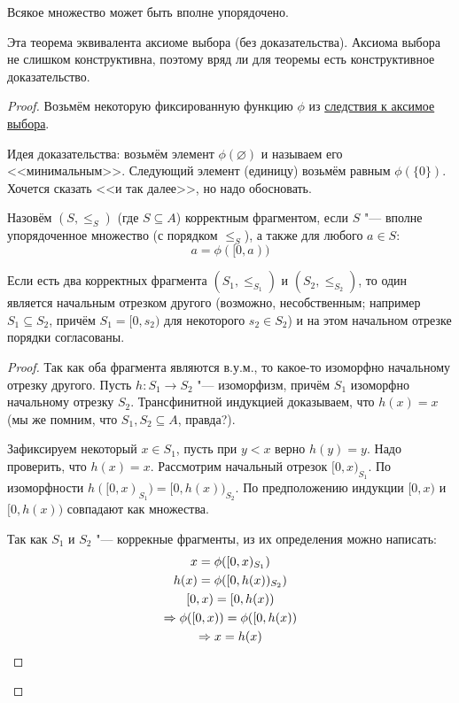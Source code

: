 \begin{theorem}[Цермелло]
	Всякое множество может быть вполне упорядочено.
\end{theorem}
\begin{Rem}
	Эта теорема эквивалента аксиоме выбора (без доказательства).
	Аксиома выбора не слишком конструктивна, поэтому вряд ли для теоремы есть конструктивное доказательство.
\end{Rem}
\begin{proof}
	Возьмём некоторую фиксированную функцию $\phi$ из \hyperref[axiom_of_choice_phi]{следствия к аксимое выбора}.

	Идея доказательства: возьмём элемент $\phi(\varnothing)$ и называем его <<минимальным>>.
	Следующий элемент (единицу) возьмём равным $\phi(\{ 0 \})$.
	Хочется сказать <<и так далее>>, но надо обосновать.

	\begin{Def}
		Назовём $(S, \le_S)$ (где $S \subseteq A$) корректным фрагментом,
		если $S$ "--- вполне упорядоченное множество (с порядком $\le_S$), а также для любого $a \in S$:
		\[ a = \phi([0, a)) \]
	\end{Def}
	\begin{lemma}
		Если есть два корректных фрагмента $(S_1, \le_{S_1})$ и $(S_2, \le_{S_2})$,
		то один является начальным отрезком другого (возможно, несобственным; например $S_1 \subseteq S_2$, причём
		$S_1=[0,s_2)$ для некоторого $s_2 \in S_2$) и на этом начальном отрезке порядки согласованы.
	\end{lemma}
	\begin{proof}
		Так как оба фрагмента являются в.у.м., то какое-то изоморфно начальному отрезку другого.
		Пусть $h \colon S_1 \to S_2$ "--- изоморфизм, причём $S_1$ изоморфно начальному отрезку $S_2$.
		Трансфинитной индукцией доказываем, что $h(x)=x$ (мы же помним, что $S_1, S_2 \subseteq A$, правда?).

		Зафиксируем некоторый $x \in S_1$, пусть при $y < x$ верно $h(y)=y$.
		Надо проверить, что $h(x)=x$.
		Рассмотрим начальный отрезок $[0, x)_{S_1}$.
		По изоморфности $h([0, x)_{S_1}) = [0, h(x))_{S_2}$.
		По предположению индукции $[0, x)$ и $[0, h(x))$  совпадают как множества.

		Так как $S_1$ и $S_2$ "--- коррекные фрагменты, из их определения можно написать:
		\begin{gather*}
			x = \phi([0, x)_{S_1}) \\
			h(x) = \phi([0, h(x))_{S_2})\\
			[0, x) = [0, h(x))\\
			\Rightarrow \phi([0, x)) = \phi([0, h(x)) \\
			\Rightarrow x = h(x)
		\end{gather*}
	\end{proof}


\end{proof}
